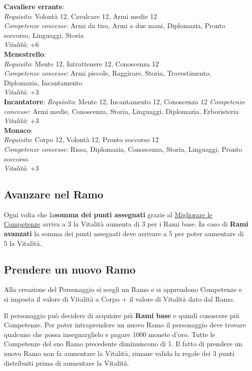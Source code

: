 \documentclass[12pt,a4paper,twoside,openany]{book}
\begin{document}
\begin{multicols}{2}
\textbf{Cavaliere errante}:\\
\textit{Requisito}: Volontà 12, Cavalcare 12, Armi medie 12\\
\textit{Competenze concesse}: Armi da tiro, Armi a due mani, Diplomazia, Pronto soccorso, Linguaggi, Storia\\
\textit{Vitalità}: +6\\

\textbf{Menestrello}:\\
\textit{Requisito}: Mente 12, Intrattenere 12, Conoscenza 12\\
\textit{Competenze concesse}: Armi piccole, Raggirare, Storia, Travestimento, Diplomazia, Incantamento\\
\textit{Vitalità}: +3\\

\textbf{Incantatore}:
\textit{Requisito}: Mente 12, Incantamento 12, Conoscenza 12
\textit{Competenze concesse}: Armi medie, Conoscenza, Storia, Linguaggi, Diplomazia, Erboristeria 
\textit{Vitalità}: +3\\

\textbf{Monaco}:\\
\textit{Requisito}: Corpo 12, Volontà 12, Pronto soccorso 12\\
\textit{Competenze concesse}: Rissa, Diplomazia, Conoscenza, Storia, Linguaggi, Pronto soccorso\\
\textit{Vitalità}: +3\\


\subsection{Avanzare nel Ramo}

Ogni volta che la\textbf{somma dei punti assegnati} grazie al \hyperlink{Migliorare le Competenze}{Migliorare le Competenze} arriva a 3 la Vitalità aumenta di 3 per i Rami base.
In caso di \textbf{Rami avanzati} la somma dei punti assegnati deve arrivare a 5 per poter aumentare di 5 la Vitalità.

\subsection{Prendere un nuovo Ramo}

Alla creazione del Personaggio si scegli un Ramo e si apprendono Competenze e si imposta il valore di Vitalità a Corpo + il valore di Vitalità dato dal Ramo.

Il personaggio può decidere di acquisire più \textbf{Rami base} e quindi conoscere più Competenze. Per poter intraprendere un nuovo Ramo il personaggio deve trovare qualcuno che possa insegnarglielo e pagare 1000 monete d'oro. Tutte le Competenze del suo Ramo precedente diminuiscono di 1.
Il fatto di prendere un nuovo Ramo non fa aumentare la Vitalità, rimane valida la regole dei 3 punti distribuiti prima di aumentare la Vitalità.


\end{multicols}
\end{document}
